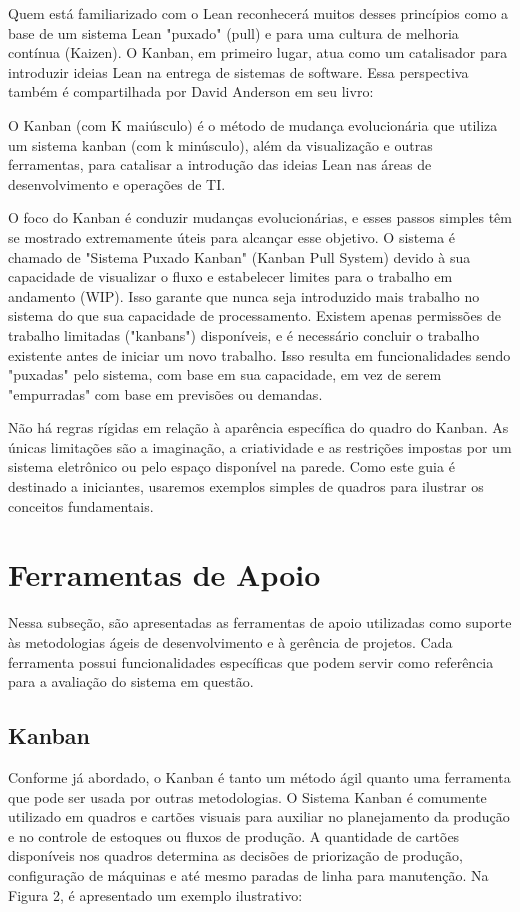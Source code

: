Quem está familiarizado com o Lean reconhecerá muitos desses princípios como a base de um sistema Lean "puxado" (pull) e para uma cultura de melhoria contínua (Kaizen). O Kanban, em primeiro lugar, atua como um catalisador para introduzir ideias Lean na entrega de sistemas de software. Essa perspectiva também é compartilhada por David Anderson em seu livro:

\begin{citacao}
	O Kanban (com K maiúsculo) é o método de mudança evolucionária que utiliza um sistema kanban (com k minúsculo), além da visualização e outras ferramentas, para catalisar a introdução das ideias Lean nas áreas de desenvolvimento e operações de TI.
\end{citacao}

O foco do Kanban é conduzir mudanças evolucionárias, e esses passos simples têm se mostrado extremamente úteis para alcançar esse objetivo. O sistema é chamado de "Sistema Puxado Kanban" (Kanban Pull System) devido à sua capacidade de visualizar o fluxo e estabelecer limites para o trabalho em andamento (WIP). Isso garante que nunca seja introduzido mais trabalho no sistema do que sua capacidade de processamento. Existem apenas permissões de trabalho limitadas ("kanbans") disponíveis, e é necessário concluir o trabalho existente antes de iniciar um novo trabalho. Isso resulta em funcionalidades sendo "puxadas" pelo sistema, com base em sua capacidade, em vez de serem "empurradas" com base em previsões ou demandas.

Não há regras rígidas em relação à aparência específica do quadro do Kanban. As únicas limitações são a imaginação, a criatividade e as restrições impostas por um sistema eletrônico ou pelo espaço disponível na parede. Como este guia é destinado a iniciantes, usaremos exemplos simples de quadros para ilustrar os conceitos fundamentais.

\section{Ferramentas de Apoio}
Nessa subseção, são apresentadas as ferramentas de apoio utilizadas como suporte às metodologias ágeis de desenvolvimento e à gerência de projetos. Cada ferramenta possui funcionalidades específicas que podem servir como referência para a avaliação do sistema em questão.

\subsection{Kanban}
Conforme já abordado, o Kanban é tanto um método ágil quanto uma ferramenta que pode ser usada por outras metodologias. O Sistema Kanban é comumente utilizado em quadros e cartões visuais para auxiliar no planejamento da produção e no controle de estoques ou fluxos de produção. A quantidade de cartões disponíveis nos quadros determina as decisões de priorização de produção, configuração de máquinas e até mesmo paradas de linha para manutenção. Na Figura 2, é apresentado um exemplo ilustrativo:

